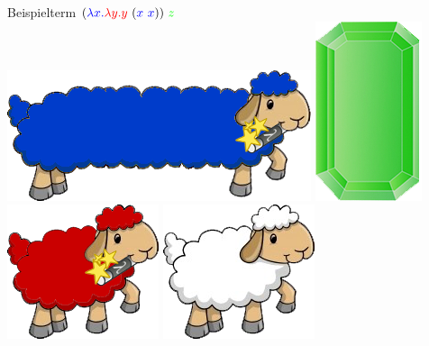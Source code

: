 \documentclass[18pt]{beamer}
\begin{document}
\begin{frame}{Beispielterm}
	$(\textcolor{blue}{\lambda x. } \textcolor{red}{\lambda y. y} \ (\textcolor{blue}{x \ x})) \ \textcolor{green}{z}$ \\
	\vspace{0.3cm}
	\includegraphics[scale=1.8]{pictures/lamb_long_blue} \hspace{0.8cm}  \includegraphics[scale=0.5]{pictures/gem_green} \\
	\vspace{0.3cm}
	\includegraphics[scale=1.7]{pictures/lamb_red} \hspace{0.1cm} \includegraphics[scale=1.7]{pictures/lamb_white}\\
	\vspace{0.3cm}

\end{frame}
\end{document}
